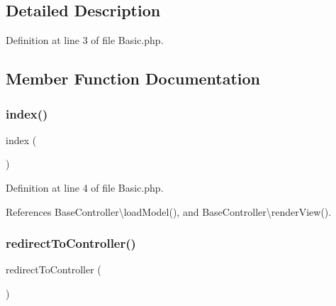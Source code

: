 \subsection{Detailed Description}


Definition at line 3 of file Basic.\+php.



\subsection{Member Function Documentation}
\hypertarget{class_basic_a149eb92716c1084a935e04a8d95f7347}{}\label{class_basic_a149eb92716c1084a935e04a8d95f7347} 
\subsubsection{\texorpdfstring{index()}{index()}}
{\footnotesize\ttfamily index (\begin{DoxyParamCaption}{ }\end{DoxyParamCaption})}



Definition at line 4 of file Basic.\+php.



References Base\+Controller\textbackslash{}load\+Model(), and Base\+Controller\textbackslash{}render\+View().


\hypertarget{class_basic_a53f01fc4c43d1cecc497d9645f920407}{}\label{class_basic_a53f01fc4c43d1cecc497d9645f920407} 
\subsubsection{\texorpdfstring{redirect\+To\+Controller()}{redirectToController()}}
{\footnotesize\ttfamily redirect\+To\+Controller (\begin{DoxyParamCaption}{ }\end{DoxyParamCaption})}



